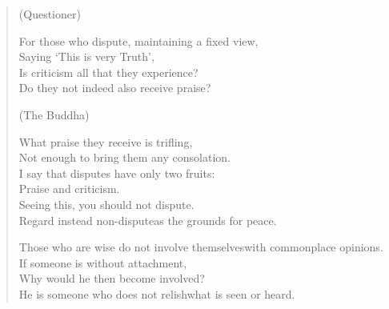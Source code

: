 
\begin{verse}

(Questioner)

 For those who dispute, maintaining a fixed view,\\
Saying `This is very Truth',\\
Is criticism all that they experience?\\
Do they not indeed also receive praise?


(The Buddha)

 What praise they receive is trifling,\\
Not enough to bring them any consolation.\\
I say that disputes have only two fruits:\\
Praise and criticism.\\
Seeing this, you should not dispute.\\
Regard instead non-dispute\newline as the grounds for peace.


 Those who are wise do not involve themselves\newline with commonplace opinions.\\
If someone is without attachment,\\
Why would he then become involved?\\
He is someone who does not relish\newline what is seen or heard.


\end{verse}
